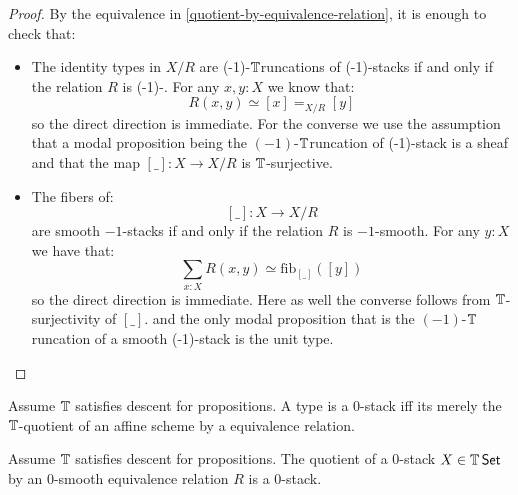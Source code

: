 \documentclass{article}
\newcommand{\truncation}{$\bT$runcation}
\newcommand{\red}[1]{{\color{red} #1}}
\begin{document}
\begin{proof}
By the equivalence in \ref{quotient-by-equivalence-relation}, it is enough to check that:
\begin{itemize}
\item The identity types in $X/R$ are \red{(-1)-\truncation s} of  (-1)-stacks if and only if the relation $R$ is (-1)-. For any $x,y:X$ we know that:
\[R(x,y) \simeq [x] =_{X/R}[y]\]
so the direct direction is immediate. For the converse we use the assumption that a modal proposition being the \red{$(-1)$-\truncation} of  (-1)-stack is a sheaf and that the map $[\_]:X\to X/R$ is $\mathbb{T}$-surjective.
\item The fibers of: 
\[[\_]:X\to X/R\] 
are smooth $-1$-stacks if and only if the relation $R$ is $-1$-smooth. For any $y:X$ we have that:
\[\sum_{x:X} R(x,y) \simeq \mathrm{fib}_{[\_]}([y])\]
so the direct direction is immediate. Here as well the converse follows from $\mathbb{T}$-surjectivity of $[\_]$. and the only modal proposition that is the \red{$(-1)$-\truncation} of a smooth (-1)-stack is the unit type. 
\end{itemize}
\end{proof}
\begin{corollary}
    Assume $\mathbb{T}$ satisfies descent for propositions.
    A type is a  0-stack iff its merely the $\mathbb{T}$-quotient of an affine scheme by a  equivalence relation.
\end{corollary}
\begin{theorem}{\label{thm:QuotientOfAlgebraicSpace}}
    Assume $\mathbb{T}$ satisfies descent for propositions. 
    The quotient of a  $0$-stack $X \in \mathbb{T} \operatorname{\mathsf {Set}}$ by an $0$-smooth equivalence relation $R$ is a  $0$-stack.
\end{theorem}
\end{document}
